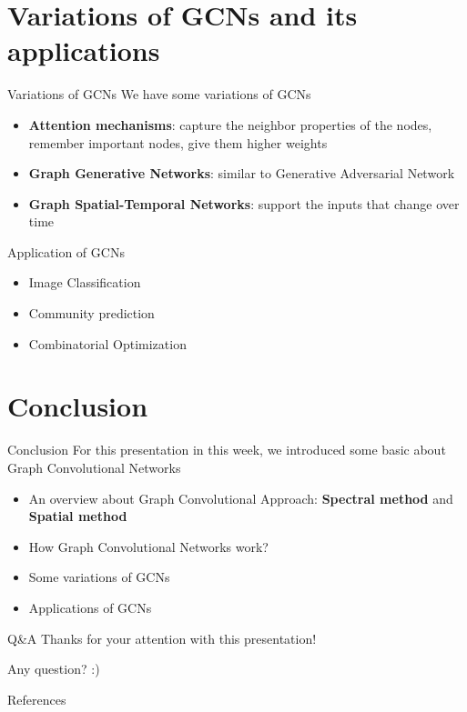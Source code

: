 \documentclass[notheorems, aspectratio=54]{beamer}
\begin{document}
	\section{Variations of GCNs and its applications}
	\begin{frame}{Variations of GCNs}
		We have some variations of GCNs
		\begin{itemize}
			\item \textbf{Attention mechanisms}: capture the neighbor properties of the nodes, remember important nodes, give them higher weights
			\item \textbf{Graph Generative Networks}: similar to Generative Adversarial Network
			\item \textbf{Graph Spatial-Temporal Networks}: support the inputs that change over time
		\end{itemize}
		Application of GCNs
		\begin{itemize}
			\item Image Classification
			\item Community prediction
			\item Combinatorial Optimization
		\end{itemize}
	\end{frame}
	\section{Conclusion}
	\begin{frame}{Conclusion}
		For this presentation in this week, we introduced some basic about Graph Convolutional Networks
		\begin{itemize}
			\item An overview about Graph Convolutional Approach: \textbf{Spectral method} and \textbf{Spatial method}
			\item How Graph Convolutional Networks work?
			\item Some variations of GCNs
			\item Applications of GCNs
		\end{itemize}
	\end{frame}
	\begin{frame}{Q\&A}
		\huge Thanks for your attention with this presentation!
		
		\huge Any question? :)
	\end{frame}
	\begin{frame}{References}
		\nocite{*}
		\newpage\cleardoublepage
		
	\end{frame}
	
\end{document}
